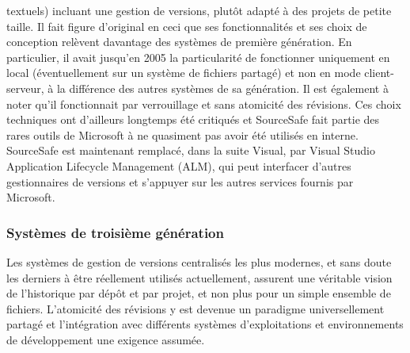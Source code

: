\begin{itemize}
  textuels) incluant une gestion de versions, plutôt adapté à des
  projets de petite taille. Il fait figure d'original en ceci que ses
  fonctionnalités et ses choix de conception relèvent davantage des
  systèmes de première génération. En particulier, il avait jusqu'en
  2005 la particularité de fonctionner uniquement en local
  (éventuellement sur un système de fichiers partagé) et non en mode
  client-serveur, à la différence des autres systèmes de sa
  génération. Il est également à noter qu'il fonctionnait par
  verrouillage et sans atomicité des révisions. Ces choix techniques
  ont d'ailleurs longtemps été critiqués et SourceSafe fait partie des
  rares outils de Microsoft à ne quasiment pas avoir été utilisés en
  interne. SourceSafe est maintenant remplacé, dans la suite Visual,
  par Visual Studio Application Lifecycle Management (ALM), qui peut
  interfacer d'autres gestionnaires de versions et s'appuyer sur les
  autres services fournis par Microsoft.
\end{itemize}

\subsubsection{Systèmes de troisième génération}

Les systèmes de gestion de versions centralisés les plus modernes, et
sans doute les derniers à être réellement utilisés actuellement,
assurent une véritable vision de l'historique par dépôt et par projet,
et non plus pour un simple ensemble de fichiers. L'atomicité des
révisions y est devenue un paradigme universellement partagé et
l'intégration avec différents systèmes d'exploitations et
environnements de développement une exigence assumée.

